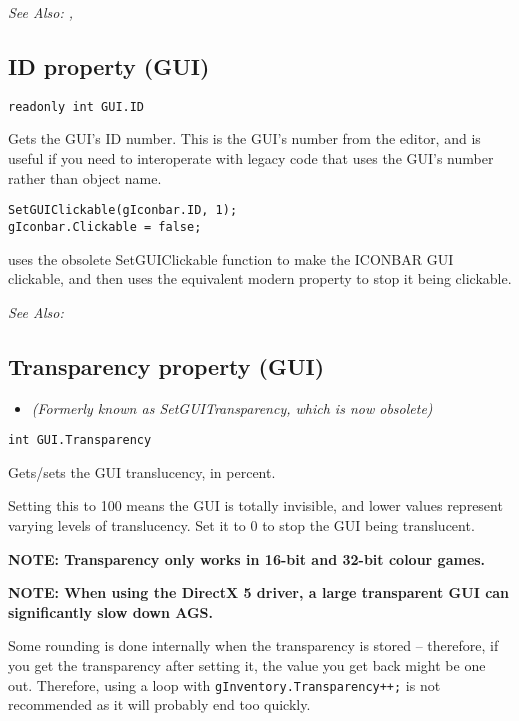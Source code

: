 \it{See Also:} , 


\subsection{ID property (GUI)}\label{GUI.ID}%

\begin{verbatim}
readonly int GUI.ID
\end{verbatim}
Gets the GUI's ID number. This is the GUI's number from the editor, and is useful
if you need to interoperate with legacy code that uses the GUI's number rather than
object name.

\begin{verbatim}
SetGUIClickable(gIconbar.ID, 1);
gIconbar.Clickable = false;
\end{verbatim}
uses the obsolete SetGUIClickable function to make the ICONBAR GUI clickable,
and then uses the equivalent modern property to stop it being clickable.

\it{See Also:} 


\subsection{Transparency property (GUI)}\label{GUI.Transparency}%

\begin{itemize}
\item \it{(Formerly known as SetGUITransparency, which is now obsolete)}
\end{itemize}

\begin{verbatim}
int GUI.Transparency
\end{verbatim}
Gets/sets the GUI translucency, in percent.

Setting this to 100 means the GUI is totally invisible, and lower values
represent varying levels of translucency. Set it to 0 to stop the
GUI being translucent.

\bf{NOTE:} Transparency only works in 16-bit and 32-bit colour games.

\bf{NOTE:} When using the DirectX 5 driver, a large transparent GUI can significantly slow
down AGS.

Some rounding is done internally when the transparency is stored -- therefore, if you get
the transparency after setting it, the value you get back might be one out. Therefore, using
a loop with \verb$gInventory.Transparency++;$ is not recommended as it will probably
end too quickly.

